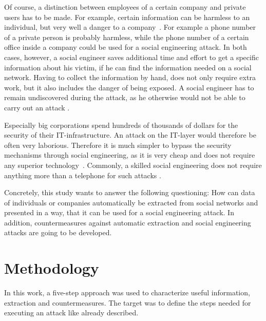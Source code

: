 Of course, a distinction between employees of a certain company and private
users has to be made. For example, certain information can be harmless to an
individual, but very well a danger to a company~\cite{mitnick2003}. For example
a phone number of a private person is probably harmless, while the phone number
of a certain office inside a company could be used for a social engineering
attack. In both cases, however, a social engineer saves additional time and
effort to get a specific information about his victim, if he can find the
information needed on a social network. Having to collect the
information by hand, does not only require extra work, but it also includes the
danger of being exposed. A social engineer has to remain undiscovered during
the attack, as he otherwise would not be able to carry out an attack
\cite{mitnick2003}.

Especially big corporations spend hundreds of thousands of dollars for the
security of their IT-infrastructure. An attack on the IT-layer would therefore
be often very laborious. Therefore it is much simpler to bypass the security
mechanisms through social engineering, as it is very cheap and does not require
any superior technology~\cite{winkler1995}. Commonly, a skilled social
engineering does not require anything more than a telephone for such attacks
\cite{mitnick2003}.

Concretely, this study wants to answer the following questioning:
How can data of individuals or companies automatically be extracted
from social networks and presented in a way, that it can be used for a social
engineering attack. In addition, countermeasures against automatic extraction
and social engineering attacks are going to be developed.

\section{Methodology}

In this work, a five-step approach was used to characterize useful information,
extraction and countermeasures. The target was to define the steps needed for
executing an attack like already described.

